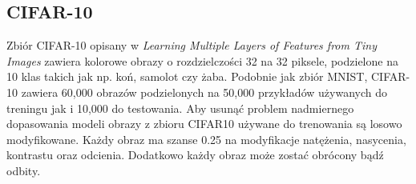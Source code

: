 \documentclass[
    left=2.5cm,         %
    right=2.5cm,        %
    top=2.5cm,          %
    bottom=3cm,         %
    bindingoffset=6mm,  %
    nohyphenation=false %
]{eiti/eiti-thesis}
\begin{document}
    \subsection{CIFAR-10}
    Zbiór CIFAR-10 opisany w \textit{Learning Multiple Layers of Features from Tiny Images} \cite{Krizhevsky2009LearningML} zawiera kolorowe obrazy o rozdzielczości 32 na 32 piksele,
    podzielone na 10 klas takich jak np. koń, samolot czy żaba. Podobnie jak zbiór MNIST, CIFAR-10 zawiera
    60,000 obrazów podzielonych na 50,000 przykładów używanych do treningu jak i 10,000 do testowania.
    Aby usunąć problem nadmiernego dopasowania modeli obrazy z zbioru CIFAR10 używane
    do trenowania są losowo modyfikowane. Każdy obraz ma szanse 0.25
    na modyfikacje natężenia, nasycenia, kontrastu oraz odcienia. Dodatkowo każdy obraz może zostać obrócony bądź odbity.
\end{document}
